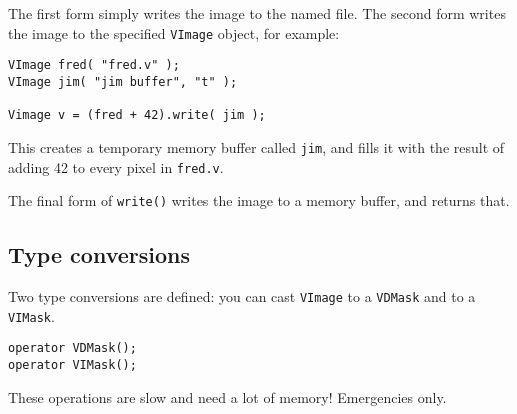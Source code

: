 The first form simply writes the image to the named file. The second form
writes the image to the specified \verb+VImage+ object, for example:

\begin{verbatim}
VImage fred( "fred.v" );
VImage jim( "jim buffer", "t" );

Vimage v = (fred + 42).write( jim );
\end{verbatim}

\noindent
This creates a temporary memory buffer called \verb+jim+, and fills it with
the result of adding 42 to every pixel in \verb+fred.v+.

The final form of \verb+write()+ writes the image to a memory buffer, and
returns that.

\subsection{Type conversions}

Two type conversions are defined: you can cast \verb+VImage+ to a
\verb+VDMask+ and to a \verb+VIMask+.

\begin{verbatim}
operator VDMask();
operator VIMask();
\end{verbatim}

These operations are slow and need a lot of memory! Emergencies only.
